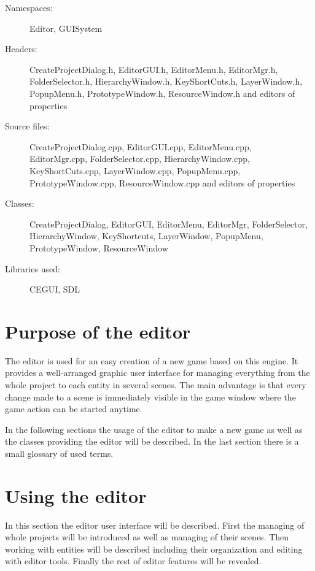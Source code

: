 \begin{description}
  \item[Namespaces:] Editor, GUISystem
  \item[Headers:] CreateProjectDialog.h, EditorGUI.h, EditorMenu.h, EditorMgr\-.h, FolderSelector.h, HierarchyWindow.h, KeyShortCuts.h, LayerWindow.h, PopupMenu.h, PrototypeWindow.h, ResourceWindow\-.h and e\-di\-tors of properties
  \item[Source files:] CreateProjectDialog.cpp, EditorGUI.cpp, EditorMenu.cpp,\\ EditorMgr.cpp, FolderSelector.cpp, HierarchyWindow.cpp, KeyShortCuts.cpp, LayerWindow.cpp, PopupMenu.cpp, PrototypeWindow\-.cpp, ResourceWindow.cpp and editors of properties
  \item[Classes:] CreateProjectDialog, EditorGUI, EditorMenu, EditorMgr, Folder\-Selector, HierarchyWindow, KeyShortcuts, LayerWindow, PopupMenu, PrototypeWindow, ResourceWindow
  \item[Libraries used:] CEGUI, SDL
\end{description}

\section{Purpose of the editor}

The editor is used for an easy creation of a new game based on this engine. It provides a well-arranged graphic user interface for managing everything from the whole project to each entity in several scenes. The main advantage is that every change made to a scene is immediately visible in the game window where the game action can be started anytime.

In the following sections the usage of the editor to make a new game as well as the classes providing the editor will be described. In the last section there is a small glossary of used terms.

\section{Using the editor}
\label{sec:editor-using}

In this section the editor user interface will be described. First the managing of whole projects will be introduced as well as managing of their scenes. Then working with entities will be described including their organization and editing with editor tools. Finally the rest of editor features will be revealed.

